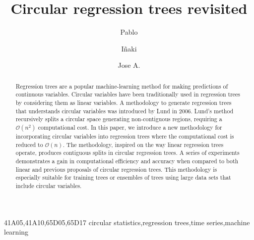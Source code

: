 \documentclass[times,twocolumn,final,authoryear]{elsarticle}
\begin{document}
\begin{frontmatter}

\title{Circular regression trees revisited}

\author[1]{Pablo }
\author[2]{I\~naki }
\author[2,3]{Jose A. }

\address[1]{National Computational Infrastructure, Building 143, Australian National University, Ward Road, ACT, 2601, Australia}
\address[2]{Intelligent Systems Group, Computer Science Faculty, University of the Basque Country, Paseo de Manuel Lardizabal, Donostia, 20018, Spain}
\address[3]{Basque Center for Applied Mathematics (BCAM), Mazarredo 14, Bilbao, 48009, Spain}





\begin{abstract}
Regression trees are a popular machine-learning method for making predictions of continuous variables. Circular variables have been traditionally used in regression trees by considering them as linear variables. A methodology to generate regression trees that understands circular variables was introduced by Lund in 2006. Lund's method recursively splits a circular space generating non-contiguous regions, requiring a $\mathcal{O}(n^2)$ computational cost. In this paper, we introduce a new methodology for incorporating circular variables into regression trees where the computational cost is reduced to $\mathcal{O}(n)$. The methodology, inspired on the way linear regression trees operate, produces contiguous splits in circular regression trees. A series of experiments demonstrates a gain in computational efficiency and accuracy when compared to both linear and previous proposals of circular regression trees. This methodology is especially suitable for training trees or ensembles of trees using large data sets that include circular variables.
\end{abstract}

\begin{keyword}
\MSC 41A05\sep 41A10\sep 65D05\sep 65D17
\KWD circular statistics\sep regression trees\sep time series\sep machine learning

\end{keyword}

\end{frontmatter}
\end{document}

